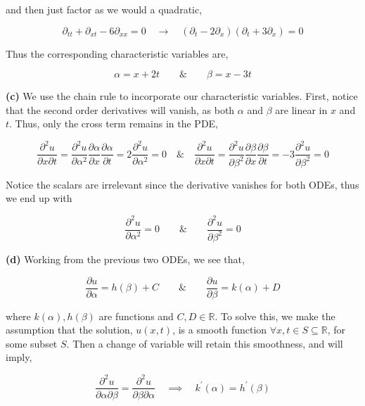 \documentclass[10pt]{article}
\newcommand{\R}{\mathbb{R}}
\begin{document}
and then just factor as we would a quadratic,

$$\partial_{tt} + \partial_{xt} - 6 \partial_{xx} = 0 \hspace{1em} \to \hspace{1em} (\partial_{t} - 2\partial_{x})(\partial_{t} + 3\partial_{x}) = 0$$

Thus the corresponding characteristic variables are,

$$\alpha = x + 2t \hspace{2em} \& \hspace{2em} \beta = x - 3t$$

\textbf{(c)}
We use the chain rule to incorporate our characteristic variables. First, notice that the second order derivatives will vanish, as both $\alpha$ and $\beta$ are linear in $x$ and $t$. Thus, only the cross term remains in the PDE,

$$\frac{\partial^{2}u}{\partial x \partial t} = \frac{\partial^{2}u}{\partial \alpha^{2}}\frac{\partial \alpha}{\partial x}\frac{\partial \alpha}{\partial t} = 2\frac{\partial^{2}u}{\partial \alpha^{2}} = 0 \hspace{1em} \& \hspace{1em} \frac{\partial^{2}u}{\partial x \partial t} = \frac{\partial^{2}u}{\partial \beta^{2}}\frac{\partial \beta}{\partial x}\frac{\partial \beta}{\partial t} = -3\frac{\partial^{2}u}{\partial \beta^{2}} = 0$$

Notice the scalars are irrelevant since the derivative vanishes for both ODEs, thus we end up with

$$\frac{\partial^{2}u}{\partial \alpha^{2}} = 0 \hspace{2em} \& \hspace{2em}\frac{\partial^{2}u}{\partial \beta^{2}} = 0$$

\textbf{(d)}
Working from the previous two ODEs, we see that,

$$\frac{\partial u}{\partial \alpha} = h(\beta) + C \hspace{2em} \& \hspace{2em}\frac{\partial u}{\partial \beta} = k(\alpha) + D$$

where $k(\alpha),h(\beta)$ are functions and $C,D \in \R$. To solve this, we make the assumption that the solution, $u(x,t)$, is a smooth function $\forall x,t\in S \subseteq\R$, for some subset $S$. Then a change of variable will retain this smoothness, and will imply,

$$\frac{\partial^{2} u}{\partial \alpha \partial \beta} = \frac{\partial^{2} u}{\partial \beta \partial \alpha} \hspace{1em} \implies \hspace{1em} k^{\prime}(\alpha) = h^{\prime}(\beta)$$
\end{document}
